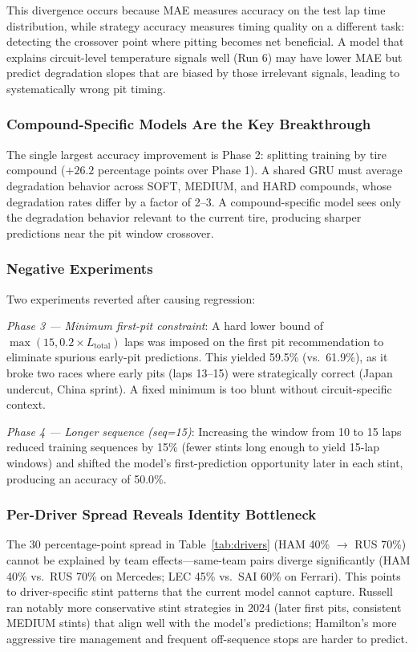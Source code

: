 \documentclass[12pt]{article}
\begin{document}
This divergence occurs because MAE measures accuracy on the test lap time distribution, while strategy accuracy measures timing quality on a different task: detecting the crossover point where pitting becomes net beneficial. A model that explains circuit-level temperature signals well (Run 6) may have lower MAE but predict degradation slopes that are biased by those irrelevant signals, leading to systematically wrong pit timing.

\subsubsection{Compound-Specific Models Are the Key Breakthrough}

The single largest accuracy improvement is Phase 2: splitting training by tire compound ($+26.2$ percentage points over Phase 1). A shared GRU must average degradation behavior across SOFT, MEDIUM, and HARD compounds, whose degradation rates differ by a factor of 2--3. A compound-specific model sees only the degradation behavior relevant to the current tire, producing sharper predictions near the pit window crossover.

\subsubsection{Negative Experiments}

Two experiments reverted after causing regression:

\textit{Phase 3 --- Minimum first-pit constraint}: A hard lower bound of $\max(15, 0.2 \times L_\text{total})$ laps was imposed on the first pit recommendation to eliminate spurious early-pit predictions. This yielded 59.5\% (vs.\ 61.9\%), as it broke two races where early pits (laps 13--15) were strategically correct (Japan undercut, China sprint). A fixed minimum is too blunt without circuit-specific context.

\textit{Phase 4 --- Longer sequence (seq=15)}: Increasing the window from 10 to 15 laps reduced training sequences by 15\% (fewer stints long enough to yield 15-lap windows) and shifted the model's first-prediction opportunity later in each stint, producing an accuracy of 50.0\%.

\subsubsection{Per-Driver Spread Reveals Identity Bottleneck}

The 30 percentage-point spread in Table~\ref{tab:drivers} (HAM 40\% $\to$ RUS 70\%) cannot be explained by team effects---same-team pairs diverge significantly (HAM 40\% vs.\ RUS 70\% on Mercedes; LEC 45\% vs.\ SAI 60\% on Ferrari). This points to driver-specific stint patterns that the current model cannot capture. Russell ran notably more conservative stint strategies in 2024 (later first pits, consistent MEDIUM stints) that align well with the model's predictions; Hamilton's more aggressive tire management and frequent off-sequence stops are harder to predict.
\end{document}

